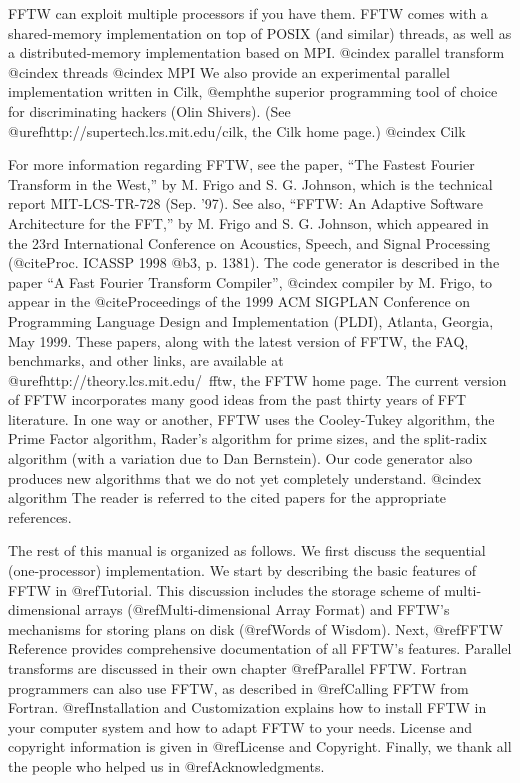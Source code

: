 FFTW can exploit multiple processors if you have them.  FFTW comes with
a shared-memory implementation on top of POSIX (and similar) threads, as
well as a distributed-memory implementation based on MPI.
@cindex parallel transform
@cindex threads
@cindex MPI
We also provide an experimental parallel implementation written in Cilk,
@emph{the superior programming tool of choice for discriminating
hackers} (Olin Shivers).  (See @uref{http://supertech.lcs.mit.edu/cilk,
the Cilk home page}.)
@cindex Cilk

For more information regarding FFTW, see the paper, ``The Fastest
Fourier Transform in the West,'' by M. Frigo and S. G. Johnson, which is
the technical report MIT-LCS-TR-728 (Sep. '97).  See also, ``FFTW: An
Adaptive Software Architecture for the FFT,'' by M. Frigo and
S. G. Johnson, which appeared in the 23rd International Conference on
Acoustics, Speech, and Signal Processing (@cite{Proc. ICASSP 1998}
@b{3}, p. 1381).  The code generator is described in the paper ``A Fast
Fourier Transform Compiler'', 
@cindex compiler
by M. Frigo, to appear in the @cite{Proceedings of the 1999 ACM SIGPLAN
Conference on Programming Language Design and Implementation (PLDI),
Atlanta, Georgia, May 1999}.  These papers, along with the latest
version of FFTW, the FAQ, benchmarks, and other links, are available at
@uref{http://theory.lcs.mit.edu/~fftw, the FFTW home page}.  The current
version of FFTW incorporates many good ideas from the past thirty years
of FFT literature.  In one way or another, FFTW uses the Cooley-Tukey
algorithm, the Prime Factor algorithm, Rader's algorithm for prime
sizes, and the split-radix algorithm (with a variation due to Dan
Bernstein).  Our code generator also produces new algorithms that we do
not yet completely understand.
@cindex algorithm
The reader is referred to the cited papers for the appropriate
references.

The rest of this manual is organized as follows.  We first discuss the
sequential (one-processor) implementation.  We start by describing the
basic features of FFTW in @ref{Tutorial}.  This discussion includes the
storage scheme of multi-dimensional arrays (@ref{Multi-dimensional Array
Format}) and FFTW's mechanisms for storing plans on disk (@ref{Words of
Wisdom}).  Next, @ref{FFTW Reference} provides comprehensive
documentation of all FFTW's features.  Parallel transforms are discussed
in their own chapter @ref{Parallel FFTW}.  Fortran programmers can also
use FFTW, as described in @ref{Calling FFTW from Fortran}.
@ref{Installation and Customization} explains how to install FFTW in
your computer system and how to adapt FFTW to your needs.  License and
copyright information is given in @ref{License and Copyright}.  Finally,
we thank all the people who helped us in @ref{Acknowledgments}.

